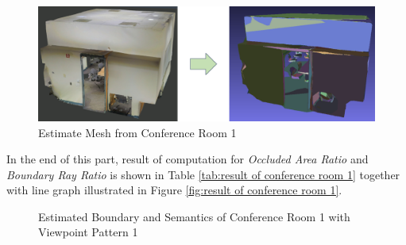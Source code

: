 \documentclass[11pt, a4paper,oneside,chapterprefix=false]{scrbook}
\begin{document}
\begin{figure}[H]
    \centering
    \includegraphics*[width=1.0\textwidth]{figures/estimate conf1.png}
    \caption{Estimate Mesh from Conference Room 1}
    \label{fig:estimate mesh from conference room 1}
\end{figure}

\vspace{30pt}

In the end of this part, result of computation for \emph{Occluded Area Ratio} and \emph{Boundary Ray Ratio} is shown in Table \ref{tab:result of conference room 1} together with line graph illustrated in Figure \ref{fig:result of conference room 1}.


\begin{figure}[H]
    \centering
      \label{fig:conf1 b 200 0} \hfill
     \label{fig:conf1 s 200 0}
    \caption{Estimated Boundary and Semantics of Conference Room 1 with Viewpoint Pattern 1}
    \label{fig:conf1 0}
\end{figure}
\end{document}
